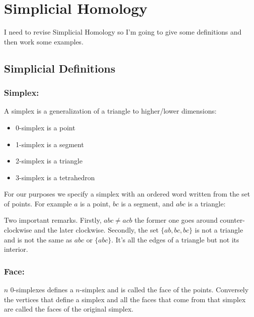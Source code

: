 
\section{Simplicial Homology}
I need to revise Simplicial Homology so I'm going to give some definitions and then work some examples.

\subsection{Simplicial Definitions}

\subsubsection{Simplex:}
A simplex is a generalization of a triangle to higher/lower dimensions:

\begin{itemize}
	\item 0-simplex is a point
	\item 1-simplex is a segment
	\item 2-simplex is a triangle
	\item 3-simplex is a tetrahedron
\end{itemize}

For our purposes we specify a simplex with an ordered word written from the set of points.
For example $a$ is a point, $bc$ is a segment, and $abc$ is a triangle:
\begin{center}
\end{center}
Two important remarks.
Firstly, $abc\neq acb$ the former one goes around counter-clockwise and the later clockwise.
Secondly, the set $\{ab,bc,bc\}$ is not a triangle and is not the same as $abc$ or $\{abc\}$.
It's all the edges of a triangle but not its interior.

\subsubsection{Face:}
$n$ 0-simplexes defines a $n$-simplex and is called the face of the points.
Conversely the vertices that define a simplex and all the faces that come from that simplex are called the faces of the original simplex.

